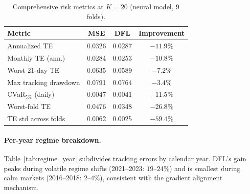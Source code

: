 \documentclass[letterpaper]{article}
\begin{document}
\begin{table}[h]
\centering
\caption{Comprehensive risk metrics at $K{=}20$ (neural model, 9 folds).}
\label{tab:risk_metrics}
\small
\begin{tabular}{@{}lccc@{}}
\toprule
Metric & MSE & DFL & Improvement \\
\midrule
Annualized TE & 0.0326 & 0.0287 & $-11.9\%$ \\
Monthly TE (ann.) & 0.0284 & 0.0253 & $-10.8\%$ \\
Worst 21-day TE & 0.0635 & 0.0589 & $-7.2\%$ \\
Max tracking drawdown & 0.0791 & 0.0764 & $-3.4\%$ \\
CVaR$_{5\%}$ (daily) & 0.0047 & 0.0041 & $-11.5\%$ \\
\midrule
Worst-fold TE & 0.0476 & 0.0348 & $-26.8\%$ \\
TE std across folds & 0.0062 & 0.0025 & $-59.4\%$ \\
\bottomrule
\end{tabular}
\end{table}

\paragraph{Per-year regime breakdown.}
Table~\ref{tab:regime_year} subdivides tracking errors by calendar year. DFL's gain peaks during volatile regime shifts (2021--2023: $19$--$24\%$) and is smallest during calm markets (2016--2018: $2$--$4\%$), consistent with the gradient alignment mechanism.

\begin{table}[h]
\centering
\caption{DFL gain by calendar year (neural model, $K{=}20$).}
\label{tab:regime_year}
\footnotesize
{}
\end{table}
\end{document}
